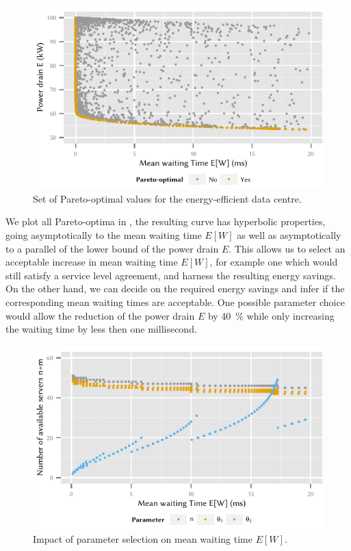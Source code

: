 \begin{figure}
  \centering
  \includegraphics{cloud/data_centers/performance_evaluation/figures/energy_vs_waiting_pareto}
  \caption{Set of Pareto-optimal values for the energy-efficient data centre.}
  \label{fig:cloud:data_centers:performance_evaluation:energy_vs_waiting_pareto}
\end{figure}

We plot all Pareto-optima in , the resulting curve has hyperbolic properties, going asymptotically to the mean waiting time \(E[W]\) as well as asymptotically to a parallel of the lower bound of the power drain \(E\).
This allows us to select an acceptable increase in mean waiting time \(E[W]\), for example one which would still satisfy a service level agreement, and harness the resulting energy savings.
On the other hand, we can decide on the required energy savings and infer if the corresponding mean waiting times are acceptable.
One possible parameter choice would allow the reduction of the power drain \(E\) by \SI{40}{\percent} while only increasing the waiting time by less then one millisecond.

\begin{figure}
  \centering
  \includegraphics{cloud/data_centers/performance_evaluation/figures/sorted_results}
  \caption{Impact of parameter selection on mean waiting time \(E[W]\).}
  \label{fig:cloud:data_centers:performance_evaluation:sorted_results}
\end{figure}

